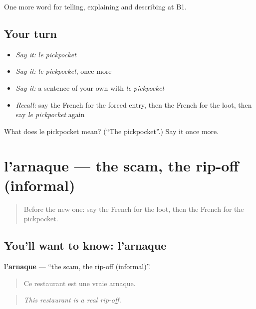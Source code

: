 \begin{grammarlens}[title={What you've built}]
One more word for telling, explaining and describing at B1.
\end{grammarlens}

\subsection*{Your turn}
\begin{itemize}
\raggedright
  \item \emph{Say it:} \emph{le pickpocket}
  \item \emph{Say it:} \emph{le pickpocket}, once more
  \item \emph{Say it:} a sentence of your own with \emph{le pickpocket}
  \item \emph{Recall:} say the French for the forced entry, then the French for the loot, then say \emph{le pickpocket} again
\end{itemize}

\begin{tcolorbox}[breakable,colback=teal!4,colframe=teal!35!black,title={Before you move on}]
What does le pickpocket mean? (\textquotedblleft{}The pickpocket\textquotedblright{}.) Say it once more.
\end{tcolorbox}
\section[l'arnaque]{l'arnaque — the scam, the rip-off (informal)}

\label{lesson:FR-C288-arnaque}



\begin{quote}
Before the new one: say the French for the loot, then the French for the pickpocket.
\end{quote}

\subsection*{You'll want to know: l'arnaque}
\textbf{l'arnaque} — \textquotedblleft{}the scam, the rip-off (informal)\textquotedblright{}.

\begin{quote}
Ce restaurant est une vraie arnaque.
\end{quote}

\begin{quote}
\emph{This restaurant is a real rip-off.}
\end{quote}

